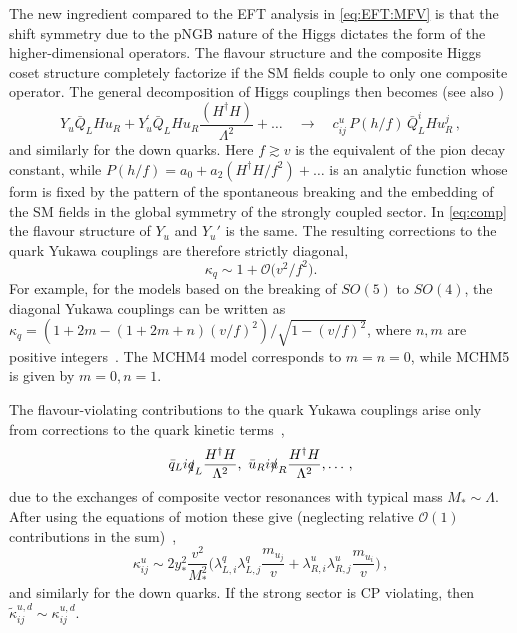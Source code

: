 \documentclass[../report.tex]{subfiles}
\begin{document}
The new ingredient compared to the EFT analysis in \eqref{eq:EFT:MFV}
is that the shift symmetry due to the pNGB nature of the Higgs
dictates the form of the higher-dimensional operators. The flavour
structure and the composite Higgs coset structure completely factorize
if the SM fields couple to only one composite operator. The general
decomposition of Higgs couplings then becomes \cite{Agashe:2009di}
(see also \cite{Gillioz:2012se,Delaunay:2013iia,Azatov:2014lha})
\begin{equation}\label{eq:comp}
	Y_u \bar{Q}_L H u_R + Y_u^\prime\bar{Q}_L H u_R
        \frac{(H^\dagger H)}{\Lambda^2}+\ldots \quad \to \quad
        c_{ij}^u \, P(h/f) \, \bar{Q}_L^i H u_R^j \,,
\end{equation}
and similarly for the down quarks. Here $f\gtrsim v$ is the equivalent
of the pion decay constant, while $P(h/f)=a_0+a_2 (H^\dagger H/f^2)+\ldots
$ is an analytic function whose form is fixed by the  pattern of the
spontaneous breaking and the embedding of the SM fields in the global
symmetry of the strongly coupled sector. In \eqref{eq:comp} the flavour
structure of $Y_u$ and $Y_u'$ 
is the same. The resulting corrections to the quark Yukawa couplings 
are therefore strictly diagonal, 
\begin{equation}\label{eq:kappaq:estimate}
\kappa_q\sim 1+{\mathcal O}\big({v^2}/{f^2}\big).
\end{equation}
For example, for the models based on the breaking of $SO(5)$ to
$SO(4)$, the diagonal Yukawa couplings can be written
as
$\kappa_q=(1+2m-(1+2m+n)(v/f)^2)/{\sqrt{1-(v/f)^2}}$,
where $n,m$ are positive integers~\cite{Pomarol:2012qf}. The MCHM4 model corresponds to
$m=n=0$, while MCHM5 is given by $m=0,n=1$.

The flavour-violating contributions to the quark Yukawa couplings
arise only from corrections to the quark kinetic terms~\cite{Agashe:2009di},
\begin{equation}
\bar q_L i \slashed q_L \frac{H^\dagger H}{\Lambda^2}, \,\,
\bar u_R i \slashed u_R \frac{H^\dagger H}{\Lambda^2},
\dots\,,
\end{equation}
due to the exchanges of composite vector resonances
with typical mass $M_* \sim \Lambda$. After using the equations of
motion 
these give (neglecting relative ${\mathcal O}(1)$ contributions
in the sum)~\cite{Agashe:2009di, Azatov:2014lha, Delaunay:2013pja},
\begin{equation}
\kappa_{ij}^u\sim 2 y_*^2 \frac{v^2}{M_*^2}
\Big(\lambda_{L,i}^q\lambda_{L,j}^q \frac{m_{u_j}}{v}
+\lambda_{R,i}^u\lambda_{R,j}^u \frac{m_{u_i}}{v}\Big)\,,
\end{equation}
and similarly for the down quarks. If the strong sector is CP
violating, then $\tilde \kappa_{ij}^{u,d}\sim \kappa_{ij}^{u,d}$.
\end{document}
